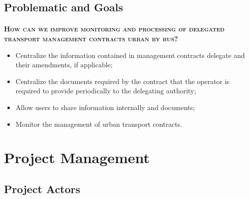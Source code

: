 \subsection{Problematic and Goals}
\begin{frame}{\insertsectionhead}
  \framesubtitle{\insertsubsectionhead}
  \textbf{\textsc{How can we improve monitoring and 
  processing of delegated transport management contracts
  urban by bus?}}
\begin{itemize}
  \item Centralize the information contained in management contracts
  delegate and their amendments, if applicable;
  \item Centralize the documents required by the contract that the operator is
  required to provide periodically to the delegating authority;
  \item Allow users to share information internally
  and documents;
  \item Monitor the management of urban transport contracts.
\end{itemize}
\end{frame}
\section{Project Management}

\subsection{Project Actors}

